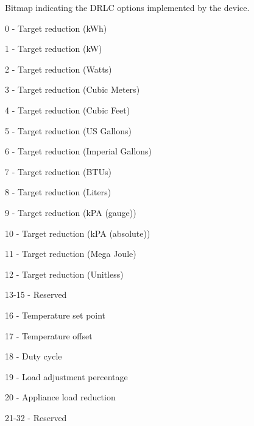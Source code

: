 Bitmap indicating the D\+R\+LC options implemented by the device.

0 -\/ Target reduction (k\+Wh)

1 -\/ Target reduction (kW)

2 -\/ Target reduction (Watts)

3 -\/ Target reduction (Cubic Meters)

4 -\/ Target reduction (Cubic Feet)

5 -\/ Target reduction (US Gallons)

6 -\/ Target reduction (Imperial Gallons)

7 -\/ Target reduction (B\+T\+Us)

8 -\/ Target reduction (Liters)

9 -\/ Target reduction (k\+PA (gauge))

10 -\/ Target reduction (k\+PA (absolute))

11 -\/ Target reduction (Mega Joule)

12 -\/ Target reduction (Unitless)

13-\/15 -\/ Reserved

16 -\/ Temperature set point

17 -\/ Temperature offset

18 -\/ Duty cycle

19 -\/ Load adjustment percentage

20 -\/ Appliance load reduction

21-\/32 -\/ Reserved 